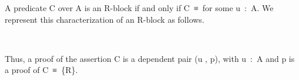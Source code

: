 A predicate \ab C over \ab A is an \ab R-block if and only if \ab C~\ad ≡~\af [~\ab u~\af ] for some \ab u~\as :~\ab A.  We represent this characterization of an \ab R-block as follows.
\ccpad
\begin{code}%
\>[0][@{}l@{\AgdaIndent{0}}]%
\>[1]\AgdaSpace{}%
\AgdaSymbol{:}\AgdaSpace{}%
\AgdaSymbol{\{}\AgdaSpace{}%
\AgdaSymbol{:}\AgdaSpace{}%
\AgdaSpace{}%
\AgdaSymbol{\}(}\AgdaSpace{}%
\AgdaSymbol{:}\AgdaSpace{}%
\AgdaSpace{}%
\AgdaSpace{}%
\AgdaSymbol{)\{}\AgdaSpace{}%
\AgdaSymbol{:}\AgdaSpace{}%
\AgdaSpace{}%
\AgdaSpace{}%
\AgdaSymbol{\}}\AgdaSpace{}%
\AgdaSpace{}%
\AgdaSpace{}%
\AgdaSpace{}%
\AgdaSpace{}%
\AgdaSpace{}%
\<%
\\
%
\>[1]\AgdaSpace{}%
\AgdaSymbol{\{}\AgdaSymbol{\}}\AgdaSpace{}%
\AgdaSpace{}%
\AgdaSymbol{\{}\AgdaSymbol{\}}\AgdaSpace{}%
\AgdaSymbol{=}\AgdaSpace{}%
\AgdaSpace{}%
\AgdaSpace{}%
\AgdaSpace{}%
\AgdaSpace{}%
\AgdaFunction{,}\AgdaSpace{}%
\AgdaSpace{}%
\AgdaSpace{}%
\AgdaOperator{\AgdaFunction{[}}\AgdaSpace{}%
\AgdaSpace{}%
\AgdaOperator{\AgdaFunction{]}}\AgdaSpace{}%
\<%
\end{code}
\ccpad
Thus, a proof of the assertion  \ab C is a dependent pair (\ab u , \ab p), with \ab u~\as :~\ab A and \ab p is a proof of \ab C~\ad ≡~\af [~\ab u~\af ]\{\ab R\}.

